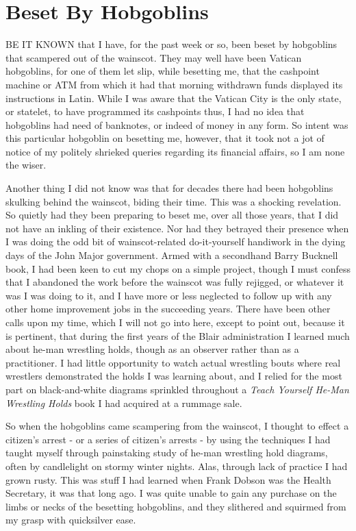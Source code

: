 \chapter{Beset By Hobgoblins}

BE IT KNOWN that I have, for the past week or so, been beset by hobgoblins that scampered out of the wainscot. They may well have been Vatican hobgoblins, for one of them let slip, while besetting me, that the cashpoint machine or ATM from which it had that morning withdrawn funds displayed its instructions in Latin. While I was aware that the Vatican City is the only state, or statelet, to have programmed its cashpoints thus, I had no idea that hobgoblins had need of banknotes, or indeed of money in any form. So intent was this particular hobgoblin on besetting me, however, that it took not a jot of notice of my politely shrieked queries regarding its financial affairs, so I am none the wiser.

Another thing I did not know was that for decades there had been hobgoblins skulking behind the wainscot, biding their time. This was a shocking revelation. So quietly had they been preparing to beset me, over all those years, that I did not have an inkling of their existence. Nor had they betrayed their presence when I was doing the odd bit of wainscot-related do-it-yourself handiwork in the dying days of the John Major government. Armed with a secondhand Barry Bucknell book, I had been keen to cut my chops on a simple project, though I must confess that I abandoned the work before the wainscot was fully rejigged, or whatever it was I was doing to it, and I have more or less neglected to follow up with any other home improvement jobs in the succeeding years. There have been other calls upon my time, which I will not go into here, except to point out, because it is pertinent, that during the first years of the Blair administration I learned much about he-man wrestling holds, though as an observer rather than as a practitioner. I had little opportunity to watch actual wrestling bouts where real wrestlers demonstrated the holds I was learning about, and I relied for the most part on black-and-white diagrams sprinkled throughout a \emph{Teach Yourself He-Man Wrestling Holds} book I had acquired at a rummage sale.

So when the hobgoblins came scampering from the wainscot, I thought to effect a citizen's arrest - or a series of citizen's arrests - by using the techniques I had taught myself through painstaking study of he-man wrestling hold diagrams, often by candlelight on stormy winter nights. Alas, through lack of practice I had grown rusty. This was stuff I had learned when Frank Dobson was the Health Secretary, it was that long ago. I was quite unable to gain any purchase on the limbs or necks of the besetting hobgoblins, and they slithered and squirmed from my grasp with quicksilver ease.

